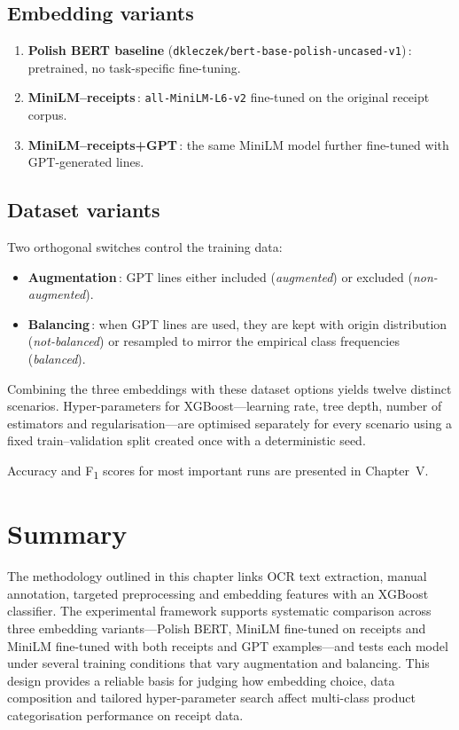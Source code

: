 \documentclass{SGGW-thesis-EN}
\begin{document}
\subsection*{Embedding variants}
\begin{enumerate}
  \item \textbf{Polish BERT baseline} (\texttt{dkleczek/bert-base-polish-uncased-v1})\,: pretrained, no task-specific
        fine-tuning.
  \item \textbf{MiniLM–receipts}\,: \texttt{all-MiniLM-L6-v2} fine-tuned on the original receipt corpus.
  \item \textbf{MiniLM–receipts+GPT}\,: the same MiniLM model further fine-tuned with GPT-generated lines.
\end{enumerate}

\subsection*{Dataset variants}
Two orthogonal switches control the training data:
\begin{itemize}
  \item \textbf{Augmentation}\,: GPT lines either included (\emph{augmented}) or excluded (\emph{non-augmented}).
  \item \textbf{Balancing}\,: when GPT lines are used, they are kept with origin distribution (\emph{not-balanced}) or resampled to mirror the
        empirical class frequencies (\emph{balanced}).
\end{itemize}

Combining the three embeddings with these dataset options yields twelve distinct scenarios. Hyper-parameters for
XGBoost—learning rate, tree depth, number of estimators and regularisation—are optimised separately for every scenario
using a fixed train–validation split created once with a deterministic seed.

Accuracy and F\textsubscript{1} scores for most important runs are presented in Chapter~V.

\section{Summary}
The methodology outlined in this chapter links OCR text extraction, manual annotation, targeted preprocessing and
embedding features with an XGBoost classifier. The experimental framework supports systematic comparison across three
embedding variants—Polish BERT, MiniLM fine-tuned on receipts and MiniLM fine-tuned with both receipts and GPT
examples—and tests each model under several training conditions that vary augmentation and balancing. This design
provides a reliable basis for judging how embedding choice, data composition and tailored hyper-parameter search affect
multi-class product categorisation performance on receipt data.
\end{document}
